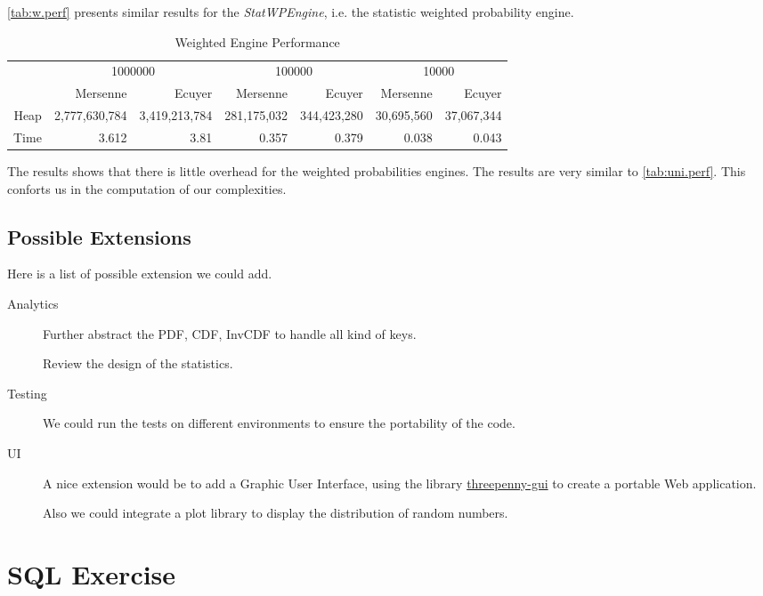\documentclass[12pt,a4paper,article]{memoir} %
\begin{document}
\autoref{tab:w.perf} presents similar results for the \emph{StatWPEngine}, 
i.e. the statistic weighted probability engine.
\begin{table}[htbp!]
  \centering \tiny
    \begin{tabular}{r|rrrrrr}
    \multicolumn{1}{r}{} & \multicolumn{2}{c}{1000000} & \multicolumn{2}{c}{100000} & \multicolumn{2}{c}{10000} \\
    \multicolumn{1}{r}{} & Mersenne & Ecuyer & Mersenne & Ecuyer & Mersenne & Ecuyer \\
\cmidrule{2-7}    Heap  & 2,777,630,784 & 3,419,213,784 & 281,175,032 & 344,423,280 & 30,695,560 & 37,067,344 \\
    Time  & 3.612 & 3.81  & 0.357 & 0.379 & 0.038 & 0.043 \\
    \end{tabular}%
  \caption{Weighted Engine Performance}
  \label{tab:w.perf}%
\end{table}%
The results shows that there is little overhead for the weighted probabilities
engines. The results are very similar to \autoref{tab:uni.perf}.
This conforts us in the computation of our complexities.

\section{Possible Extensions}
Here is a list of possible extension we could add.
\begin{description}
	\item [Analytics]
	Further abstract the PDF, CDF, InvCDF to handle all kind of keys.
	
	Review the design of the statistics.
	\item [Testing]
	We could run the tests on different environments to ensure the portability of 
	the code.
	\item [UI] 
	A nice extension would be to add a Graphic User Interface,
	using the library 
	\href{https://hackage.haskell.org/package/threepenny-gui}{threepenny-gui}
	to create a portable Web application. 

	Also we could integrate a plot library to display the distribution of 
	random numbers.
\end{description}

\newpage
\chapter{SQL Exercise}
\end{document}
